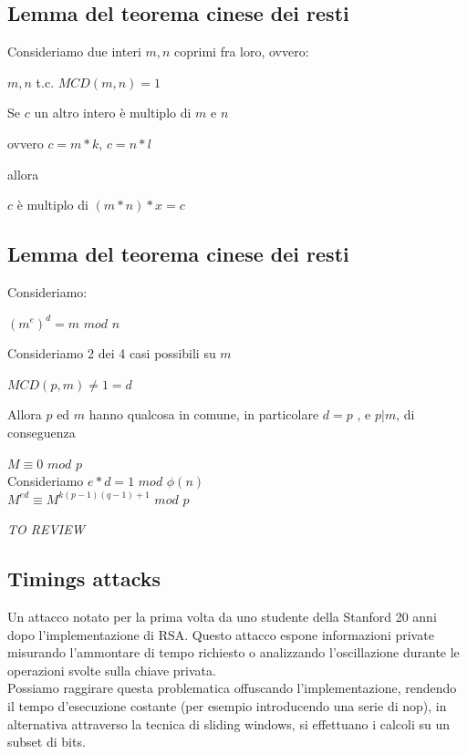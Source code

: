 \documentclass[11pt, oneside]{article}   	%
\begin{document}
\subsection*{Lemma del teorema cinese dei resti}
Consideriamo due interi $m, n$ coprimi fra loro, ovvero:
\begin{center}
$m,n$ t.c. $MCD(m,n) = 1$
\end{center}
Se $c$ un altro intero è multiplo di $m$ e $n$ \begin{center}
ovvero $c = m*k$, $c = n*l$\end{center}
 allora 
 \begin{center}
 $c$ è multiplo di $(m*n)*x = c$
 \end{center}
\subsection*{Lemma del teorema cinese dei resti}
Consideriamo:\begin{center}
$(m^e)^d = m$ $mod$ $n$
\end{center}
Consideriamo 2 dei 4 casi possibili su $m$
\begin{center}
$MCD(p,m) \neq 1 = d$
\end{center}
Allora $p$ ed $m$ hanno qualcosa in comune, in particolare $d=  p$ , e $p | m$, di conseguenza
\begin{center}
$M \equiv 0$ $mod$ $p$\\
Consideriamo $e*d = 1$ $mod$ $\phi(n)$\\
$M^{ed} \equiv M^{k(p-1)(q-1)+1}$ $mod$ $p$\\
\end{center}
\emph{TO REVIEW}

\subsection*{Timings attacks}
Un attacco notato per la prima volta da uno studente della Stanford 20 anni dopo l'implementazione di RSA. Questo attacco espone informazioni private misurando l'ammontare di tempo richiesto o analizzando l'oscillazione durante le operazioni svolte sulla chiave privata.\\
Possiamo raggirare questa problematica offuscando l'implementazione, rendendo il tempo d'esecuzione costante (per esempio introducendo una serie di nop), in alternativa attraverso la tecnica di sliding windows, si effettuano i calcoli su un subset di bits. 
\end{document}
